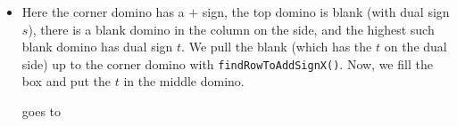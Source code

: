 \documentclass[12pt]{article}
\numberwithin{equation}{section}
\newcommand{\horizontalDominoRSShift}[4]{\filldraw [dominoRSStyle] (#2 - 1 + #4 + \eps, #1 - 1 + \eps) rectangle + (2 - \teps, 1 -\teps) node [dominoText] {$#3$};}
\newcommand{\verticalDominoRSShift}[4]{\filldraw [dominoRSStyle] (#2 - 1 + #4 + \eps,  #1 - 1 + \eps) rectangle + (1 - \teps,2 -\teps) node [dominoText] {$#3$};}
\begin{document}
\begin{itemize}
\begin{itemize}
      \item Here the corner domino has a $+$ sign, the top domino is blank (with dual sign $s$), there is a blank domino in the column on the side, and the highest such blank domino has dual sign $t$.
      We pull the blank (which has the $t$ on the dual side) up to the corner domino with \texttt{findRowToAddSignX()}.
      Now, we fill the box and put the $t$ in the middle domino.
      \begin{figure}[H]
        \centering
      \end{figure}
      goes to
      \begin{figure}[H]
        \centering
\end{figure}
\end{itemize}
\end{itemize}
\end{document}
